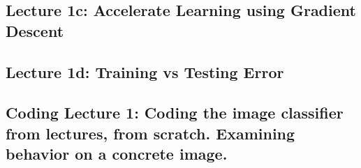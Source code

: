\documentclass[12pt]{article}
\begin{document}
    \subsection*{Lecture 1c: Accelerate Learning using Gradient Descent}
      \subsubsection*{}
      \subsubsection*{}
      \subsubsection*{}
      \subsubsection*{}
      \subsubsection*{}
    \newpage

    \subsection*{Lecture 1d: Training vs Testing Error} %
      \subsubsection*{}
      \subsubsection*{}
      \subsubsection*{}
      \subsubsection*{}
      \subsubsection*{}

    \subsection*{Coding Lecture 1: Coding the image classifier from lectures, from scratch.  Examining behavior on a concrete image.}
\end{document}
